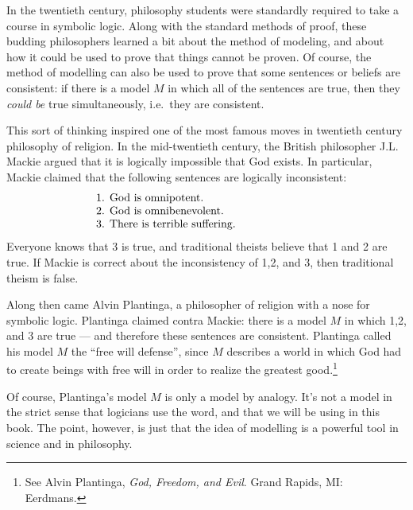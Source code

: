 In the twentieth century, philosophy students were standardly required
to take a course in symbolic logic.  Along with the standard methods
of proof, these budding philosophers learned a bit about the method of
modeling, and about how it could be used to prove that things cannot
be proven.  Of course, the method of modelling can also be used to
prove that some sentences or beliefs are consistent: if there is a
model $M$ in which all of the sentences are true, then they {\it could
  be} true simultaneously, i.e.\ they are consistent.

This sort of thinking inspired one of the most famous moves in
twentieth century philosophy of religion.  In the mid-twentieth
century, the British philosopher J.L. Mackie argued that it is
logically impossible that God exists.  In particular, Mackie claimed
that the following sentences are logically inconsistent:
\[ \begin{array}{p{7cm}} 1. God is omnipotent. \\ 2. God is
    omnibenevolent. \\ 3. There is terrible suffering. \end{array} \]
Everyone knows that 3 is true, and traditional theists believe that 1
and 2 are true.  If Mackie is correct about the inconsistency of 1,2,
and 3, then traditional theism is false.

Along then came Alvin Plantinga, a philosopher of religion with a nose
for symbolic logic.  Plantinga claimed contra Mackie: there is a model
$M$ in which 1,2, and 3 are true --- and therefore these sentences are
consistent.  Plantinga called his model $M$ the ``free will defense'',
since $M$ describes a world in which God had to create beings with
free will in order to realize the greatest good.\footnote{See Alvin
  Plantinga, \textit{God, Freedom, and Evil}.  Grand Rapids, MI:
  Eerdmans.}

Of course, Plantinga's model $M$ is only a model by analogy.  It's not
a model in the strict sense that logicians use the word, and that we
will be using in this book.  The point, however, is just that the idea
of modelling is a powerful tool in science and in philosophy.

